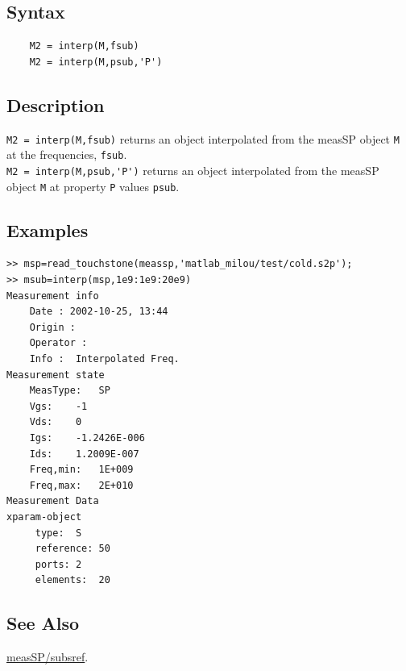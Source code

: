 \subsection{Syntax}
\begin{verbatim}
    M2 = interp(M,fsub)
    M2 = interp(M,psub,'P')
\end{verbatim}

\subsection{Description}
\verb"M2 = interp(M,fsub)" returns an object interpolated from the measSP object \verb"M" at the frequencies, \verb"fsub".\\
\verb"M2 = interp(M,psub,'P')" returns an object interpolated from the measSP object \verb"M" at property \verb"P" values \verb"psub".\\

\subsection{Examples}
\begin{verbatim}
>> msp=read_touchstone(meassp,'matlab_milou/test/cold.s2p');
>> msub=interp(msp,1e9:1e9:20e9)
Measurement info
    Date : 2002-10-25, 13:44
    Origin :
    Operator :
    Info :  Interpolated Freq.
Measurement state
    MeasType:   SP
    Vgs:    -1
    Vds:    0
    Igs:    -1.2426E-006
    Ids:    1.2009E-007
    Freq,min:   1E+009
    Freq,max:   2E+010
Measurement Data
xparam-object
     type:  S
     reference: 50
     ports: 2
     elements:  20
\end{verbatim}
\subsection{See Also}
\hyperlink{measSP_subsref}{measSP/subsref}.
